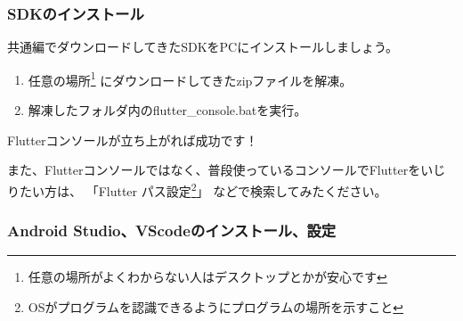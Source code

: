 \documentclass{jsarticle}
\begin{document}
            \subsubsection*{SDKのインストール}
                共通編でダウンロードしてきたSDKをPCにインストールしましょう。

                \begin{enumerate}
                    \item 任意の場所\footnote{任意の場所がよくわからない人はデスクトップとかが安心です}
                          にダウンロードしてきたzipファイルを解凍。
                    \item 解凍したフォルダ内のflutter\_console.batを実行。
                \end{enumerate}

                Flutterコンソールが立ち上がれば成功です！

                また、Flutterコンソールではなく、普段使っているコンソールでFlutterをいじりたい方は、
                「Flutter パス設定\footnote{OSがプログラムを認識できるようにプログラムの場所を示すこと}」
                などで検索してみたください。

            \subsubsection*{Android Studio、VScodeのインストール、設定}
                
            
\end{document}
